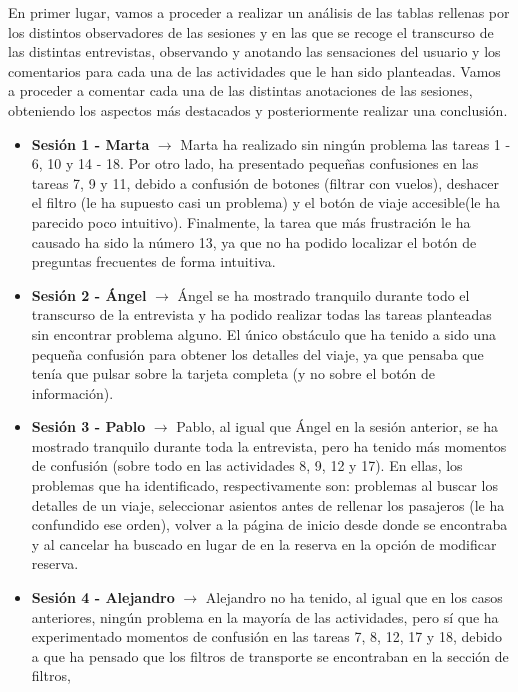 En primer lugar, vamos a proceder a realizar un análisis de las tablas rellenas por los distintos observadores de las sesiones
y en las que se recoge el transcurso de las distintas entrevistas, observando y anotando las sensaciones del usuario y los comentarios
para cada una de las actividades que le han sido planteadas. Vamos a proceder a comentar cada una de las distintas anotaciones de las sesiones,
obteniendo los aspectos más destacados y posteriormente realizar una conclusión.
\begin{itemize}
    \item \textbf{Sesión 1 - Marta} $\rightarrow$ Marta ha realizado sin ningún problema las tareas 1 - 6, 10 y 14 - 18. Por otro lado, ha presentado
          pequeñas confusiones en las tareas 7, 9 y 11, debido a confusión de botones (filtrar con vuelos), deshacer el filtro (le ha supuesto casi un problema)
          y el botón de viaje accesible(le ha parecido poco intuitivo). Finalmente, la tarea que más frustración le ha causado ha sido la número 13, ya que no
          ha podido localizar el botón de preguntas frecuentes de forma intuitiva.
    \item \textbf{Sesión 2 - Ángel} $\rightarrow$ Ángel se ha mostrado tranquilo durante todo el transcurso de la entrevista y ha podido realizar todas las
          tareas planteadas sin encontrar problema alguno. El único obstáculo que ha tenido a sido una pequeña confusión para obtener los detalles del viaje, ya que
          pensaba que tenía que pulsar sobre la tarjeta completa (y no sobre el botón de información).
    \item \textbf{Sesión 3 - Pablo} $\rightarrow$ Pablo, al igual que Ángel en la sesión anterior, se ha mostrado tranquilo durante toda la entrevista, pero ha tenido
          más momentos de confusión (sobre todo en las actividades 8, 9, 12 y 17). En ellas, los problemas que ha identificado, respectivamente son: problemas al buscar los
          detalles de un viaje, seleccionar asientos antes de rellenar los pasajeros (le ha confundido ese orden), volver a la página de inicio desde donde se encontraba y
          al cancelar ha buscado en lugar de en la reserva en la opción de modificar reserva.
    \item \textbf{Sesión 4 - Alejandro} $\rightarrow$ Alejandro no ha tenido, al igual que en los casos anteriores, ningún problema en la mayoría de las actividades, pero
          sí que ha experimentado momentos de confusión en las tareas 7, 8, 12, 17 y 18, debido a que ha pensado que los filtros de transporte se encontraban en la sección de filtros,

\end{itemize}
